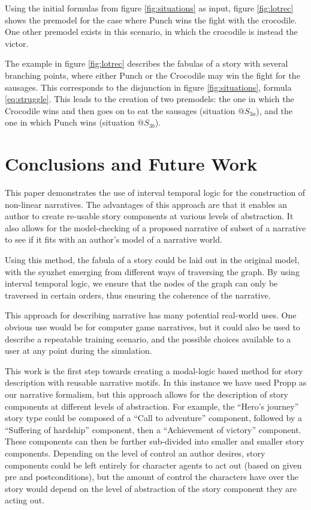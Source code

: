 \documentclass{llncs}
\begin{document}
Using the initial formulas from figure \ref{fig:situations} as input, figure \ref{fig:lotrec} shows the premodel for the case where Punch wins the fight with the crocodile. One other premodel exists in this scenario, in which the crocodile is instead the victor.

The example in figure \ref{fig:lotrec} describes the fabulas of a story with several branching points, where either Punch or the Crocodile may win the fight for the sausages. This corresponds to the disjunction in figure \ref{fig:situations}, formula \ref{eq:struggle}. This leads to the creation of two premodels: the one in which the Crocodile wins and then goes on to eat the sausages (situation $@S_{3a}$), and the one in which Punch wins (situation $@S_{3b}$).

\section{Conclusions and Future Work}
This paper demonstrates the use of interval temporal logic for the construction of non-linear narratives. The advantages of this approach are that it enables an author to create re-usable story components at various levels of abstraction. It also allows for the model-checking of a proposed narrative of subset of a narrative to see if it fits with an author's model of a narrative world.

Using this method, the fabula of a story could be laid out in the original model, with the syuzhet emerging from different ways of traversing the graph. By using interval temporal logic, we ensure that the nodes of the graph can only be traversed in certain orders, thus ensuring the coherence of the narrative.

This approach for describing narrative has many potential real-world uses. One obvious use would be for computer game narratives, but it could also be used to describe a repeatable training scenario, and the possible choices available to a user at any point during the simulation.

This work is the first step towards creating a modal-logic based method for story description with reusable narrative motifs. In this instance we have used Propp as our narrative formalism, but this approach allows for the description of story components at different levels of abstraction. For example, the ``Hero's journey'' story type could be composed of a ``Call to adventure'' component, followed by a ``Suffering of hardship'' component, then a ``Achievement of victory'' component. These components can then be further sub-divided into smaller and smaller story components. Depending on the level of control an author desires, story components could be left entirely for character agents to act out (based on given pre and postconditions), but the amount of control the characters have over the story would depend on the level of abstraction of the story component they are acting out.
\end{document}
